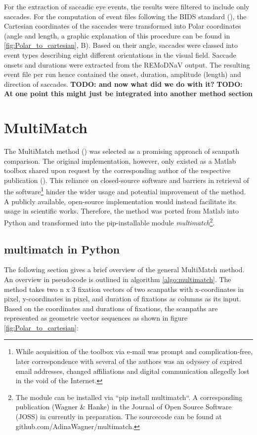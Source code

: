 \documentclass[a4paper, 12pt]{scrreprt}
\begin{document}
{For the extraction of saccadic eye events, the results were filtered to include only saccades. For the computation of event files following the BIDS standard (\cite{gorgolewski2016brain}), the Cartesian coordinates of the saccades were transformed into Polar coordinates (angle and length, a graphic explanation of this procedure can be found in \ref{fig:Polar_to_cartesian}, B). Based on their angle, saccades were classed into event types describing eight different orientations in the visual field. Saccade onsets and durations were extracted from the REMoDNaV output. The resulting event file per run hence contained the onset, duration, amplitude (length) and direction of saccades. \newline \textbf{TODO: and now what did we do with it?}
\textbf{TODO: At one point this might just be integrated into another method section}

\section{MultiMatch}\label{section:multimatch}

The MultiMatch method (\cite{jarodzka2010vector}) was selected as a promising approach of scanpath comparison. The original implementation, however, only existed as a Matlab toolbox shared upon request by the corresponding author of the respective publication (\cite{dewhurst2012depends}). This reliance on closed-source software and barriers in retrieval of the software\footnote{While acquisition of the toolbox via e-mail was prompt and complication-free, later correspondence with several of the authors was an odyssey of expired email addresses, changed affiliations and digital communication allegedly lost in the void of the Internet.} hinder the wider usage and potential improvement of the method. A publicly available, open-source implementation would instead facilitate its usage in scientific works. Therefore, the method was ported from Matlab into Python and transformed into the pip-installable module \textit{multimatch}\footnote{The module can be installed via ``pip install multimatch``. A corresponding publication (Wagner \& Hanke) in the Journal of Open Source Software (JOSS) in currently in preparation. The sourcecode can be found at github.com/AdinaWagner/multimatch.}.

\subsection{multimatch in Python}
The following section gives a brief overview of the general MultiMatch method. An overview in pseudocode is outlined in algorithm \ref{algo:multimatch}. \newline 
The method takes two n x 3 fixation vectors of two scanpaths with x-coordinates in pixel, y-coordinates in pixel, and duration of fixations as columns as its input. Based on the coordinates and durations of fixations, the scanpaths are represented as geometric vector sequences as shown in figure \ref{fig:Polar_to_cartesian}:

}
\end{document}

